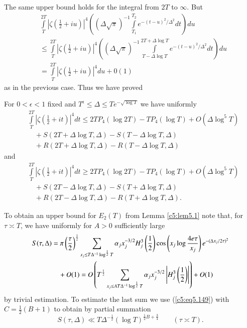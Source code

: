 The same upper bound holds for the integral from $2T$ to $\infty$. But 
\begin{align*}
& \int\limits^{2T}_T \left|\zeta \left(\frac{1}{2} + iu \right)
  \right|^4 \left((\Delta \sqrt{\pi})^{-1} \int\limits^{T_2}_{T_1}
  e^{-(t-u)^2/\Delta^2}dt \right) du\\ 
& \leq \int\limits^{2T}_T \left|\zeta \left(\frac{1}{2} + i u
  \right)\right|^4 \left((\Delta \sqrt{\pi})^{-1} \int\limits^{2T
    +\Delta \log T}_{T - \Delta \log T} e^{-(t-u)^2 /\Delta^2} dt
  \right) du\\ 
&  = \int\limits^{2T}_T \left|\zeta \left(\frac{1}{2} + i u
  \right)\right|^4 du + 0(1) 
\end{align*}\pageoriginale
as in the previous case. Thus we have proved

\begin{lemma}\label{c5:lem5.1}
For $0 < \epsilon < 1$ fixed and $T^{\epsilon} \leq \Delta \leq T
e^{-\sqrt{\log T}} $ 
we have uniformly
\begin{align*}
&\int\limits^{2T}_T\left|\zeta \left(\frac{1}{2} + it \right)\right|^4 
  dt \leq 2T P_4 (\log 2T) - T P_4 (\log T) + O(\Delta \log^5 T)\\ 
&\quad{} + S(2T + \Delta \log T, \Delta) - S(T - \Delta \log T,
  \Delta)\\  
&\quad {}+ R (2T + \Delta \log T, \Delta)- R (T - \Delta \log T,
  \Delta)  
 \end{align*}
and 
\begin{align*}
&\int\limits^{2T}_{T} \left|\zeta \left(\frac{1}{2} + it
  \right)\right|^4 dt \geq 
2 T P_4 (\log 2T) - T P_4 (\log T) + O(\Delta \log^5 T)\\ 
&\quad {}+ S (2T - \Delta \log T,\Delta) - S(T+ \Delta \log T, \Delta)\\
&\quad {} + R (2T - \Delta \log T, \Delta) - R(T+ \Delta \log  T, \Delta). 
\end{align*}
\end{lemma}

To obtain an upper bound for $E_2(T)$ from Lemma \ref{c5:lem5.1} note
that, for $\tau \asymp T$, we have uniformly for $A >0$ sufficiently
large  
{\fontsize{9pt}{11pt}\selectfont
\begin{align}
S (\tau,\Delta)  & = \pi \left(\frac{\tau}{2} \right)^{\frac{1}{2}}
\sum\limits_{x_j \leq T \Delta^{-1} \log^{\frac{1}{2}} T} \alpha_j
x_j^{-3/2} H^3_j \left(\frac{1}{2} \right) \cos \left(x_j \log
\frac{4e\tau}{x_j} \right) e^{-(\Delta x_j / 2 \tau)^2}
\label{c5:eq5.161}\\ 
& \quad +  O (1) = O \left(T^{\frac{1}{2}} \sum\limits_{x_j \leq A T
  \Delta^{-1} \log^{\frac{1}{2}} T} \alpha_j x^{-3/2}_j \left|H^3_j
\left(\frac{1}{2} \right)\right| \right) + O(1)\notag 
\end{align}}
by trivial estimation. To  estimate the last sum we use
(\ref{c5:eq5.149}) with $C = \frac{1}{2}(B+1)$ to obtain by partial
summation  
$$ 
S (\tau,\Delta) \ll T\Delta^{-\frac{1}{2}} (\log T)^{\frac{1}{2} B
  +\frac{3}{4}} \qquad (\tau \asymp T). 
$$

